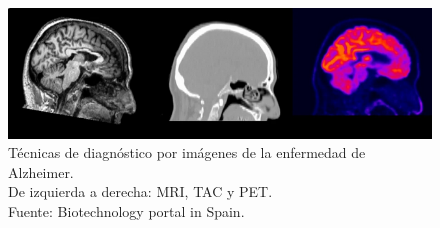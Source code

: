 \begin{figure}[H]
    \centering
    \includegraphics[width=\textwidth]{./imgs/MRI-TAC-PET}
    \caption{Técnicas de diagnóstico por imágenes de la enfermedad de Alzheimer.\\ De izquierda a derecha: MRI, TAC y PET.
    \\Fuente: Biotechnology portal in Spain.}
    \label{fig:tecnicas-diagnosico-imagen}
\end{figure}